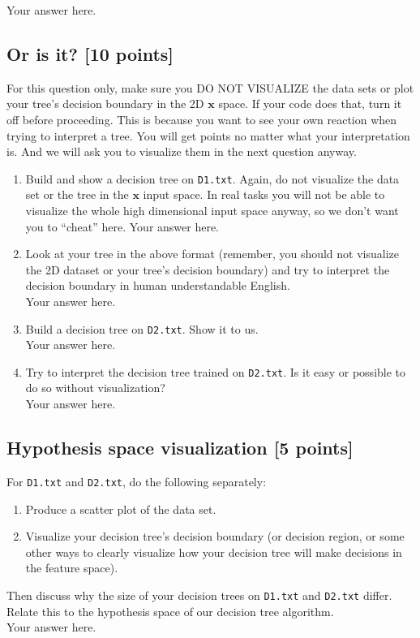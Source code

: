 \documentclass[a4paper]{article}
\theoremstyle{definition}
\def\x{\mathbf x}
\begin{document}
{\color{blue} Your answer here.}

\subsection{Or is it? [10 points]}\label{orisit}
For this question only, make sure you DO NOT VISUALIZE the data sets or plot your tree's decision boundary in the 2D $\x$ space.  If your code does that, turn it off before proceeding.  This is because you want to see your own reaction when trying to interpret a tree.  You will get points no matter what your interpretation is.
And we will ask you to visualize them in the next question anyway.

\begin{enumerate}
  \item Build and show a decision tree on {\tt D1.txt}. Again, do not visualize the data set or the tree in the $\x$ input space.  In real tasks you will not be able to visualize the whole high dimensional input space anyway, so we don't want you to ``cheat'' here.
  {\color{blue} Your answer here.}
  \item Look at your tree in the above format (remember, you should not visualize the 2D dataset or your tree's decision boundary) and try to interpret the decision boundary in human understandable English.\\{\color{blue} Your answer here.}
  \item Build a decision tree on {\tt D2.txt}.  Show it to us.\\{\color{blue} Your answer here.}
  \item Try to interpret the decision tree trained on {\tt D2.txt}. Is it easy or possible to do so without visualization?\\{\color{blue} Your answer here.}
\end{enumerate}

\subsection{Hypothesis space visualization [5 points]}\label{hypothesis}
For {\tt D1.txt} and {\tt D2.txt}, do the following separately:
  \begin{enumerate}
  \item Produce a scatter plot of the data set.
  \item Visualize your decision tree's decision boundary (or decision region, or some other ways to clearly visualize how your decision tree will make decisions in the feature space).
  \end{enumerate}
Then discuss why the size of your decision trees on {\tt D1.txt} and {\tt D2.txt} differ.  Relate this to the hypothesis space of our decision tree algorithm.\\{\color{blue} Your answer here.}
\end{document}
